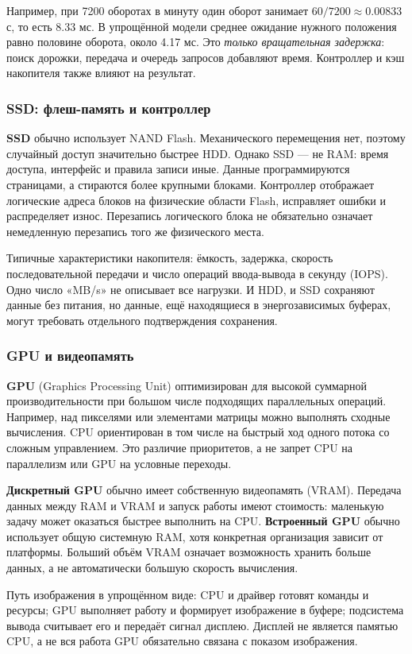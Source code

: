 Например, при 7200 оборотах в минуту один оборот занимает
$60/7200\approx0.00833$ с, то есть 8.33 мс. В упрощённой модели среднее
ожидание нужного положения равно половине оборота, около 4.17 мс.
Это \emph{только вращательная задержка}: поиск дорожки, передача и очередь
запросов добавляют время. Контроллер и кэш накопителя также влияют на результат.

\subsubsection*{SSD: флеш-память и контроллер}
\textbf{SSD} обычно использует NAND Flash. Механического перемещения нет,
поэтому случайный доступ значительно быстрее HDD. Однако SSD --- не RAM:
время доступа, интерфейс и правила записи иные. Данные программируются
страницами, а стираются более крупными блоками. Контроллер отображает
логические адреса блоков на физические области Flash, исправляет ошибки
и распределяет износ. Перезапись логического блока не обязательно означает
немедленную перезапись того же физического места.

Типичные характеристики накопителя: ёмкость, задержка, скорость
последовательной передачи и число операций ввода-вывода в секунду (IOPS).
Одно число «MB/s» не описывает все нагрузки. И HDD, и SSD сохраняют данные
без питания, но данные, ещё находящиеся в энергозависимых буферах, могут
требовать отдельного подтверждения сохранения.

\subsubsection*{GPU и видеопамять}
\textbf{GPU} (Graphics Processing Unit) оптимизирован для высокой суммарной
производительности при большом числе подходящих параллельных операций.
Например, над пикселями или элементами матрицы можно выполнять сходные
вычисления. CPU ориентирован в том числе на быстрый ход одного потока
со сложным управлением. Это различие приоритетов, а не запрет CPU на
параллелизм или GPU на условные переходы.

\textbf{Дискретный GPU} обычно имеет собственную видеопамять (VRAM).
Передача данных между RAM и VRAM и запуск работы имеют стоимость: маленькую
задачу может оказаться быстрее выполнить на CPU. \textbf{Встроенный GPU}
обычно использует общую системную RAM, хотя конкретная организация зависит
от платформы. Больший объём VRAM означает возможность хранить больше данных,
а не автоматически большую скорость вычисления.

Путь изображения в упрощённом виде: CPU и драйвер готовят команды и ресурсы;
GPU выполняет работу и формирует изображение в буфере; подсистема вывода
считывает его и передаёт сигнал дисплею. Дисплей не является памятью CPU,
а не вся работа GPU обязательно связана с показом изображения.

